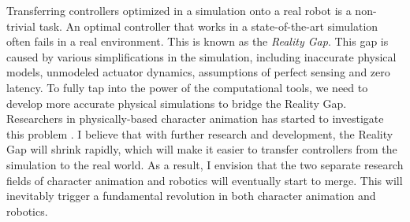Transferring controllers optimized in a simulation onto a real robot is a non-trivial task. An optimal controller that works in a state-of-the-art simulation often fails in a real environment. This is known as the \emph{Reality Gap}. This gap is caused by various simplifications in the simulation, including inaccurate physical models, unmodeled actuator dynamics, assumptions of perfect sensing and zero latency. To fully tap into the power of the computational tools, we need to develop more accurate physical simulations to bridge the Reality Gap. Researchers in physically-based character animation has started to investigate this problem \cite{Bharaj:2015,Megaro:2015}. I believe that with further research and development, the Reality Gap will shrink rapidly, which will make it easier to transfer controllers from the simulation to the real world. As a result, I envision that the two separate research fields of character animation and robotics will eventually start to merge. This will inevitably trigger a fundamental revolution in both character animation and robotics.


